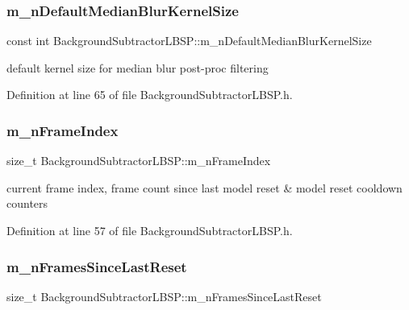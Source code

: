\subsubsection{\texorpdfstring{m\+\_\+n\+Default\+Median\+Blur\+Kernel\+Size}{m\_nDefaultMedianBlurKernelSize}}
{\footnotesize\ttfamily const int Background\+Subtractor\+L\+B\+S\+P\+::m\+\_\+n\+Default\+Median\+Blur\+Kernel\+Size\hspace{0.3cm}{\ttfamily [protected]}}



default kernel size for median blur post-\/proc filtering 



Definition at line 65 of file Background\+Subtractor\+L\+B\+S\+P.\+h.

\mbox{\label{class_background_subtractor_l_b_s_p_a8a2350cad84f19c68ef61b7aaf91c43f}} 
\subsubsection{\texorpdfstring{m\+\_\+n\+Frame\+Index}{m\_nFrameIndex}}
{\footnotesize\ttfamily size\+\_\+t Background\+Subtractor\+L\+B\+S\+P\+::m\+\_\+n\+Frame\+Index\hspace{0.3cm}{\ttfamily [protected]}}



current frame index, frame count since last model reset \& model reset cooldown counters 



Definition at line 57 of file Background\+Subtractor\+L\+B\+S\+P.\+h.

\mbox{\label{class_background_subtractor_l_b_s_p_ab56bf775dfdf0579e834e45210c3a92a}} 
\subsubsection{\texorpdfstring{m\+\_\+n\+Frames\+Since\+Last\+Reset}{m\_nFramesSinceLastReset}}
{\footnotesize\ttfamily size\+\_\+t Background\+Subtractor\+L\+B\+S\+P\+::m\+\_\+n\+Frames\+Since\+Last\+Reset\hspace{0.3cm}{\ttfamily [protected]}}



